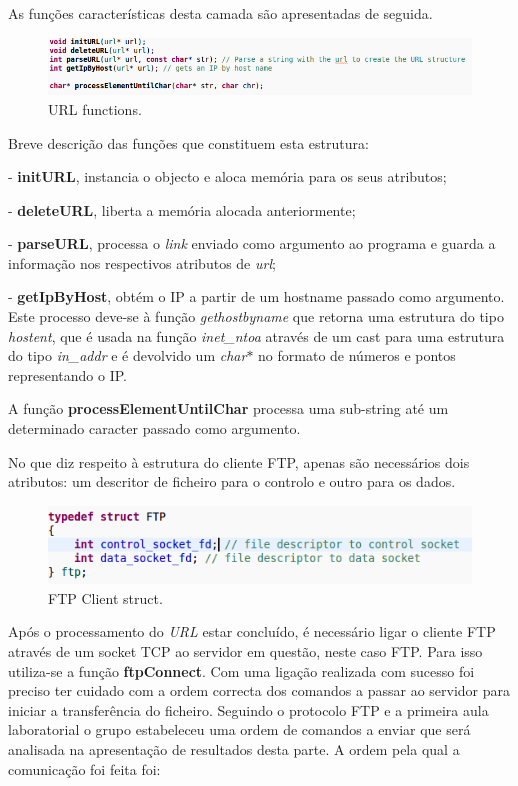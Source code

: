 \documentclass[a4paper]{article}
\begin{document}
As funções características desta camada são apresentadas de seguida.
\pagebreak

\begin{figure}[h!]
\includegraphics[scale=0.5]{res/url-functions.png}
\caption{URL functions.}
\end{figure}

Breve descrição das funções que constituem esta estrutura:

- \textbf{initURL}, instancia o objecto e aloca memória para os seus atributos;

- \textbf{deleteURL}, liberta a memória alocada anteriormente;

- \textbf{parseURL}, processa o \textit{link} enviado como argumento ao programa e guarda a informação nos respectivos atributos de \textit{url};

- \textbf{getIpByHost}, obtém o IP a partir de um hostname passado como argumento. Este processo deve-se à função \textit{gethostbyname} que retorna uma estrutura do tipo \textit{hostent}, que é usada na função \textit{inet\_ntoa} através de um cast para uma estrutura do tipo \textit{in\_addr} e é devolvido um \textit{char$*$} no formato de números e pontos representando o IP.

A função \textbf{processElementUntilChar} processa uma sub-string até um determinado caracter passado como argumento.\linebreak

No que diz respeito à estrutura do cliente FTP, apenas são necessários dois atributos: um descritor de ficheiro para o controlo e outro para os dados.

\begin{figure}[h!]
\includegraphics[scale=0.5]{res/ftp-struct.png}
\caption{FTP Client struct.}
\end{figure}

Após o processamento do \textit{URL} estar concluído, é necessário ligar o cliente FTP através de um socket TCP ao servidor em questão, neste caso FTP. Para isso utiliza-se a função \textbf{ftpConnect}. Com uma ligação realizada com sucesso foi preciso ter cuidado com a ordem correcta dos comandos a passar ao servidor para iniciar a transferência do ficheiro. Seguindo o protocolo FTP e a primeira aula laboratorial o grupo estabeleceu uma ordem de comandos a enviar que será analisada na apresentação de resultados desta parte. A ordem pela qual a comunicação foi feita foi:
\end{document}
